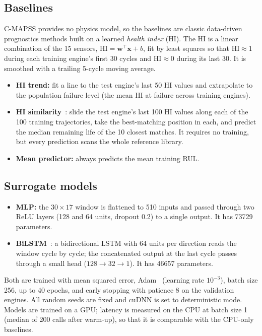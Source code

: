 \documentclass[11pt,a4paper]{article}
\begin{document}
\subsection{Baselines}
C-MAPSS provides no physics model, so the baselines are classic data-driven
prognostics methods built on a learned \emph{health index} (HI). The HI is a
linear combination of the 15 sensors, $\mathrm{HI} = \mathbf{w}^\top
\mathbf{x} + b$, fit by least squares so that $\mathrm{HI} \approx 1$ during
each training engine's first 30 cycles and $\mathrm{HI} \approx 0$ during its
last 30. It is smoothed with a trailing 5-cycle moving average.
\begin{itemize}
  \item \textbf{HI trend:} fit a line to the test engine's last 50 HI values
        and extrapolate to the population failure level (the mean HI at failure
        across training engines).
  \item \textbf{HI similarity}~\cite{wang2008}: slide the test engine's last 100
        HI values along each of the 100 training trajectories, take the
        best-matching position in each, and predict the median remaining life
        of the 10 closest matches. It requires no training, but every
        prediction scans the whole reference library.
  \item \textbf{Mean predictor:} always predicts the mean training RUL.
\end{itemize}

\subsection{Surrogate models}
\begin{itemize}
  \item \textbf{MLP:} the $30 \times 17$ window is flattened to 510 inputs and
        passed through two ReLU layers (128 and 64 units, dropout 0.2) to a
        single output. It has \num{73729} parameters.
  \item \textbf{BiLSTM}~\cite{hochreiter1997}: a bidirectional LSTM with 64
        units per direction reads the window cycle by cycle; the concatenated
        output at the last cycle passes through a small head
        ($128 \to 32 \to 1$). It has \num{46657} parameters.
\end{itemize}
Both are trained with mean squared error, Adam~\cite{kingma2015} (learning rate
$10^{-3}$), batch size 256, up to 40 epochs, and early stopping with patience 8
on the validation engines. All random seeds are fixed and cuDNN is set to
deterministic mode. Models are trained on a GPU; latency is measured on the CPU
at batch size 1 (median of 200 calls after warm-up), so that it is comparable
with the CPU-only baselines.
\end{document}
